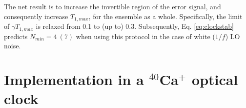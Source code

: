 The net result is to increase the invertible region of the error signal, and consequently increase $T_{1,max}$, for the ensemble as a whole. Specifically, the limit of $\gamma T_{1,max}$ is relaxed from 0.1 to (up to) 0.3. Subsequently, Eq. \ref{eq:clockstab} predicts $N_{min} = 4 \ (7)$ when using this protocol in the case of white ($1/f$) LO noise. 










\section{Implementation in a $^{40}$Ca$^+$ optical clock}

